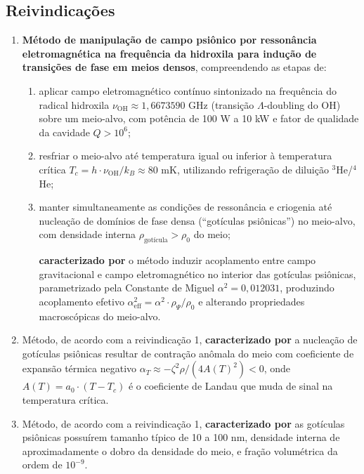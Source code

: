 \documentclass[12pt,a4paper]{article}
\newcommand{\alphaii}{\alpha^2}
\newcommand{\rhoPsi}{\rho_\Psi}
\newcommand{\nuOH}{\nu_{\text{OH}}}
\newcommand{\Tcrit}{T_c}
\begin{document}
\subsection*{Reivindicações}

\begin{enumerate}

\item \textbf{Método de manipulação de campo psiônico por
ressonância eletromagnética na frequência da hidroxila para
indução de transições de fase em meios densos}, compreendendo
as etapas de:
  \begin{enumerate}[label=(\alph*)]
  \item aplicar campo eletromagnético contínuo sintonizado na
  frequência do radical hidroxila $\nuOH \approx 1{,}6673590$
  GHz (transição $\Lambda$-doubling do OH) sobre um meio-alvo,
  com potência de 100 W a 10 kW e fator de qualidade da
  cavidade $Q > 10^6$;
  \item resfriar o meio-alvo até temperatura igual ou inferior à
  temperatura crítica $\Tcrit = h \cdot \nuOH / k_B \approx
  80$ mK, utilizando refrigeração de diluição $^3$He/$^4$He;
  \item manter simultaneamente as condições de ressonância e
  criogenia até nucleação de domínios de fase densa
  (``gotículas psiônicas'') no meio-alvo, com densidade interna
  $\rho_{\text{gotícula}} > \rho_0$ do meio;

  \textbf{caracterizado por} o método induzir acoplamento entre
  campo gravitacional e campo eletromagnético no interior das
  gotículas psiônicas, parametrizado pela Constante de Miguel
  $\alphaii = 0{,}012031$, produzindo acoplamento efetivo
  $\alphaii_{\text{eff}} = \alphaii \cdot \rhoPsi / \rho_0$
  e alterando propriedades macroscópicas do meio-alvo.
  \end{enumerate}


\item Método, de acordo com a reivindicação 1,
\textbf{caracterizado por} a nucleação de gotículas psiônicas
resultar de contração anômala do meio com coeficiente de
expansão térmica negativo $\alpha_T \approx -\zeta^2 \rho /
(4 A(T)^2) < 0$, onde $A(T) = a_0 \cdot (T - \Tcrit)$ é o
coeficiente de Landau que muda de sinal na temperatura crítica.

\item Método, de acordo com a reivindicação 1,
\textbf{caracterizado por} as gotículas psiônicas possuírem
tamanho típico de 10 a 100 nm, densidade interna de
aproximadamente o dobro da densidade do meio, e fração
volumétrica da ordem de $10^{-9}$.


\end{enumerate}
\end{document}
